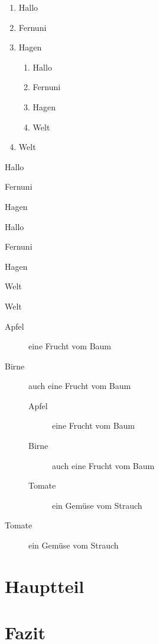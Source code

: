 \documentclass[12pt,ngerman,parskip=half]{scrreprt}
\begin{document}
\begin{enumerate}
\item Hallo
\item Fernuni
\item Hagen
\begin{enumerate}
\item Hallo
\item Fernuni
\item Hagen
\item Welt
\end{enumerate}
\item Welt
\end{enumerate}

\begin{compactenum}[I]
\item Hallo
\item Fernuni
\item Hagen
\begin{compactenum}[A.]
\item Hallo
\item Fernuni
\item Hagen
\item Welt
\end{compactenum}
\item Welt
\end{compactenum}


\begin{description}
\item[Apfel] eine Frucht vom Baum
\item[Birne] auch eine Frucht vom Baum

\begin{description}
\item[Apfel] eine Frucht vom Baum
\item[Birne] auch eine Frucht vom Baum
\item[Tomate] ein Gemüse vom Strauch
\end{description}

\item[Tomate] ein Gemüse vom Strauch
\end{description}


\section{Hauptteil}

\blindtext[1] 

\blindtext[1]

\section{Fazit}
\end{document}
